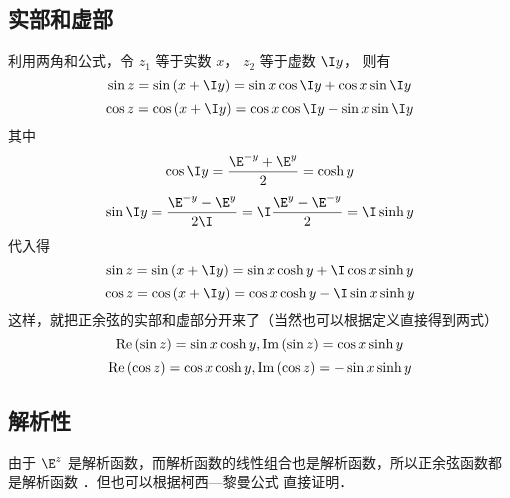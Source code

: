 \subsection{实部和虚部}
利用两角和公式，令 ${z_1}$ 等于实数 $x$，  ${z_2}$ 等于虚数 $\I y$， 则有
 \begin{equation}
\sin z = \sin \left( {x + \I y} \right) = \sin x\cos \I y + \cos x\sin \I y
\end{equation} 
\begin{equation}
\cos z = \cos \left( {x + \I y} \right) = \cos x\cos \I y - \sin x\sin \I y
\end{equation} 
其中
\begin{equation}
\cos \I y = \frac{\E^{ - y} + \E^y}{2} = \cosh y
\end{equation} 
\begin{equation}
\sin \I y = \frac{\E^{ - y} - \E^y}{2\I} = \I\frac{\E^y - \E^{ - y}}{2} = \I\sinh y
\end{equation} 
代入得
\begin{equation}
\sin z = \sin \left( {x + \I y} \right) = \sin x\cosh y + \I\cos x\sinh y
\end{equation} 
\begin{equation}
\cos z = \cos \left( {x + \I y} \right) = \cos x\cosh y - \I\sin x\sinh y
\end{equation}  
这样，就把正余弦的实部和虚部分开来了（当然也可以根据定义直接得到两式）
\begin{equation}
{\mathop{\rm Re}\nolimits} \left( {\sin z} \right) = \sin x\cosh y,{\mathop{\rm Im}\nolimits} \left( {\sin z} \right) = \cos x\sinh y
\end{equation} 
\begin{equation}
{\mathop{\rm Re}\nolimits} \left( {\cos z} \right) = \cos x\cosh y,{\mathop{\rm Im}\nolimits} \left( {\cos z} \right) =  - \sin x\sinh y
\end{equation}
\subsection{解析性}
由于 ${\E^z}$ 是解析函数，而解析函数的线性组合也是解析函数，所以正余弦函数都是解析函数%
．但也可以根据柯西—黎曼公式%
直接证明．






















